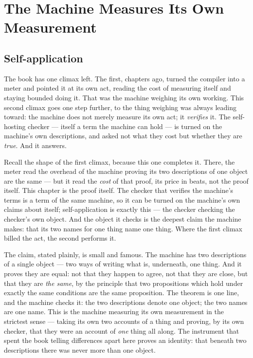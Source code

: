 \chapter{The Machine Measures Its Own Measurement}

\section{Self-application}

The book has one climax left. The first, chapters ago, turned the compiler into a meter and pointed it at its own act,
reading the cost of measuring itself and staying bounded doing it. That was the machine weighing its own working. This
second climax goes one step further, to the thing weighing was always leading toward: the machine does not merely
measure its own act; it \emph{verifies} it. The self-hosting checker --- itself a term the machine can hold --- is
turned on the machine's own descriptions, and asked not what they cost but whether they are \emph{true}. And it
answers.

Recall the shape of the first climax, because this one completes it. There, the meter read the overhead of the machine
proving its two descriptions of one object are the same --- but it read the \emph{cost} of that proof, its price in
beats, not the proof itself. This chapter is the proof itself. The checker that verifies the machine's terms is a term
of the same machine, so it can be turned on the machine's own claims about itself; self-application is exactly this ---
the checker checking the checker's own object. And the object it checks is the deepest claim the machine makes: that
its two names for one thing name one thing. Where the first climax billed the act, the second performs it.

The claim, stated plainly, is small and famous. The machine has two descriptions of a single object --- two ways of
writing what is, underneath, one thing. And it proves they are equal: not that they happen to agree, not that they are
close, but that they are \emph{the same}, by the principle that two propositions which hold under exactly the same
conditions are the same proposition. The theorem is one line, and the machine checks it: the two descriptions denote
one object; the two names are one name. This is the machine measuring its own measurement in the strictest sense ---
taking its own two accounts of a thing and proving, by its own checker, that they were an account of \emph{one} thing
all along. The instrument that spent the book telling differences apart here proves an identity: that beneath two
descriptions there was never more than one object.

